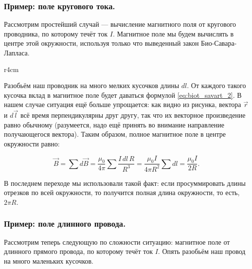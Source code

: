 \documentclass[a4paper,12pt]{article}
\begin{document}
\subsubsection{Пример: поле кругового тока.}
\label{sec:ex_current_circle}

Рассмотрим простейший случай — вычисление магнитного поля
от кругового проводника, по которому течёт ток $I$. Магнитное поле мы
будем вычислять в центре этой окружности, используя только что
выведенный закон Био-Савара-Лапласа.

\begin{wrapfigure}{r}{4cm}
\centering
{}
\label{fig:current_circle}
\end{wrapfigure}

Разобьём наш проводник на много мелких кусочков длины $dl$. От каждого
такого кусочка вклад в магнитное поле будет даваться формулой
\eqref{eq:biot_savart_2}. В нашем случае ситуация ещё больше
упрощается: как видно из рисунка, вектора $\vec{r}$ и $d\vec{l}$ всё
время перпендикулярны друг другу, так что их векторное произведение
равно обычному (разумеется, надо ещё принять во внимание направление
получающегося вектора). Таким образом, полное магнитное поле в центре
окружности равно: 

\begin{equation}
  \label{eq:ex_current_circle}
  \vec{B} = \sum d\vec{B} = \frac{\mu_0}{4\pi} \sum \frac{I\, dl\, R}{R^3} =
  \frac{\mu_0 I}{4 \pi R^2} \sum dl = \frac{\mu_0 I}{2R}.
\end{equation}

В последнем переходе мы использовали такой факт: если просуммировать
длины отрезков по всей окружности, то получится полная длина
окружности, то есть, $2\pi R$.

\subsubsection{Пример: поле длинного провода.}
\label{sec:wire_current}

Рассмотрим теперь следующую по сложности ситуацию: магнитное поле от
длинного прямого провода, по которому течёт ток $I$. Опять разобьём
наш провод на много маленьких кусочков. 
\end{document}
